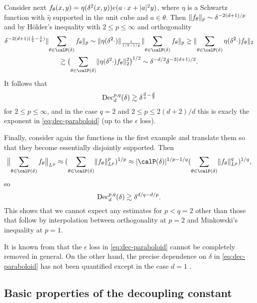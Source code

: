 \begin{example}
Consider next $f_{\theta}(x,y)=\eta(\delta^{2} (x,y)) e(a \cdot x + \lvert a\rvert^{2} y)$, where $\eta$ is a Schwartz function with $\hat\eta$ supported in the unit cube and $a \in \theta$.
Then $\lVert f_{\theta}\rVert_{p} \sim \delta^{-2(d+1)/p}$ and by H\"older's inequality with $2 \leq p \leq \infty$ and orthogonality
\begin{multline*}
\delta^{-2(d+1)(\frac12-\frac1p)} \norm{\sum_{\theta \in \Part{\delta}} f_{\theta}}_{p}
\sim
\norm{\eta(\delta^{2}\cdot)}_{\frac{1}{1/2-1/p}} \norm{\sum_{\theta \in \Part{\delta}} f_{\theta}}_{p}
\geq
\norm{\sum_{\theta \in \Part{\delta}} \eta(\delta^{2}\cdot) f_{\theta}}_{2}\\
\gtrsim
\bigl( \sum_{\theta \in \Part{\delta}} \norm{\eta(\delta^{2}\cdot) f_{\theta}}_{2}^{2} \bigr)^{1/2}
\sim
\delta^{-d/2}\delta^{-2(d+1)/2}.
\end{multline*}
It follows that
\[
\mathrm{Dec}_{d}^{p,q}(\delta) \gtrsim \delta^{\frac{d}{q}-\frac{d}{2}}
\]
for $2 \leq p \leq \infty$, and in the case $q=2$ and $2 \leq p \leq 2(d+2)/d$ this is exacly the exponent in \eqref{eq:dec-paraboloid} (up to the $\epsilon$ loss).
\end{example}

\begin{example}
Finally, consider again the functions in the first example and translate them so that they become essentially disjointly supported.
Then
\[
\norm[\big]{\sum_{\theta \in \Part{\delta}} f_{\theta}}_{L^p}
\approx
(\sum_{\theta \in \Part{\delta}} \norm{f_{\theta}}_{L^p}^p)^{1/p}
\approx
\abs{\Part{\delta}}^{1/p-1/q} (\sum_{\theta \in \Part{\delta}} \norm{f_{\theta}}_{L^p}^q)^{1/q},
\]
so
\[
\mathrm{Dec}_{d}^{p,q}(\delta) \gtrsim \delta^{d/q-d/p}.
\]
This shows that we cannot expect any estimates for $p<q=2$ other than those that follow by interpolation between orthogonality at $p=2$ and Minkowski's inequality at $p=1$.
\end{example}

\begin{remark}
It is known from \cite[p.~118]{MR1209299} that the $\epsilon$ loss in \eqref{eq:dec-paraboloid} cannot be completely removed in general.
On the other hand, the precise dependence on $\delta$ in \eqref{eq:dec-paraboloid} has not been quantified except in the case $d=1$ \cite{arxiv:1711.01202}.
\end{remark}


\subsection{Basic properties of the decoupling constant}
